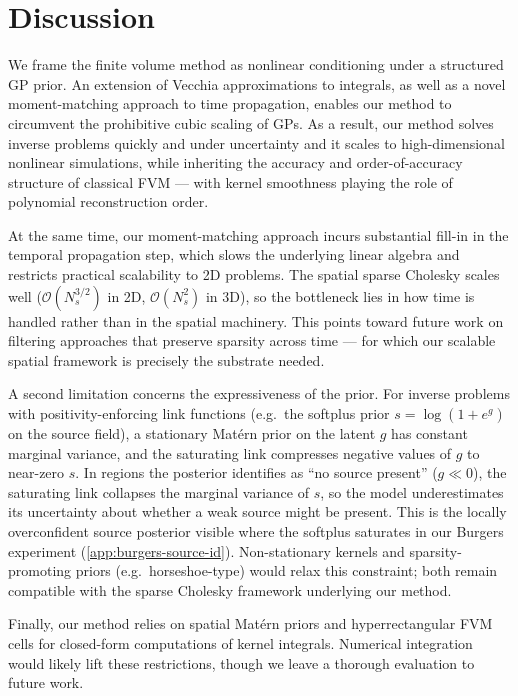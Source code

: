 \documentclass{article}
\theoremstyle{plain}
\theoremstyle{definition}
\theoremstyle{remark}
\begin{document}
\section{Discussion}
\label{sec:discussion}

We frame the finite volume method as nonlinear conditioning under a structured GP prior.
An extension of Vecchia approximations to integrals, as well as a novel moment-matching approach to time propagation, enables our method to circumvent the prohibitive cubic scaling of GPs.
As a result, our method solves inverse problems quickly and under uncertainty and it scales to high-dimensional nonlinear simulations, while inheriting the accuracy and order-of-accuracy structure of classical FVM --- with kernel smoothness playing the role of polynomial reconstruction order.

At the same time, our moment-matching approach incurs substantial fill-in in the temporal propagation step, which slows the underlying linear algebra and restricts practical scalability to 2D problems.
The spatial sparse Cholesky scales well ($\mathcal{O}(N_s^{3/2})$ in 2D, $\mathcal{O}(N_s^{2})$ in 3D), so the bottleneck lies in how time is handled rather than in the spatial machinery.
This points toward future work on filtering approaches that preserve sparsity across time --- for which our scalable spatial framework is precisely the substrate needed.

A second limitation concerns the expressiveness of the prior.
For inverse problems with positivity-enforcing link functions (e.g.\ the softplus prior $s = \log(1 + e^g)$ on the source field), a stationary Mat\'ern prior on the latent $g$ has constant marginal variance, and the saturating link compresses negative values of $g$ to near-zero $s$.
In regions the posterior identifies as ``no source present'' ($g \ll 0$), the saturating link collapses the marginal variance of $s$, so the model underestimates its uncertainty about whether a weak source might be present.  This is the locally overconfident source posterior visible where the softplus saturates in our Burgers experiment (\cref{app:burgers-source-id}).
Non-stationary kernels and sparsity-promoting priors (e.g.\ horseshoe-type) would relax this constraint; both remain compatible with the sparse Cholesky framework underlying our method.

Finally, our method relies on spatial Mat\'ern priors and hyperrectangular FVM cells for closed-form computations of kernel integrals.
Numerical integration would likely lift these restrictions, though we leave a thorough evaluation to future work.
\end{document}
